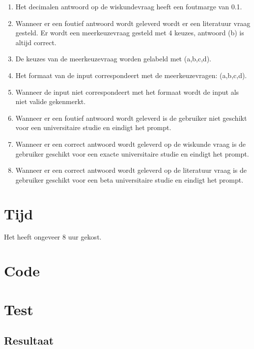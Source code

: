 \documentclass[10pt]{article}
\begin{document}
\begin{enumerate}
      \item Het decimalen antwoord op de wiskundevraag heeft een foutmarge van 0.1.
      \item Wanneer er een foutief antwoord wordt geleverd wordt er een literatuur vraag gesteld. Er wordt een
            meerkeuzevraag gesteld met 4 keuzes, antwoord (b) is altijd correct.
      \item De keuzes van de meerkeuzevraag worden gelabeld met (a,b,c,d).
      \item Het formaat van de input correspondeert met de meerkeuzevragen: (a,b,c,d).
      \item Wanneer de input niet correspondeert met het formaat wordt de input als niet valide gekenmerkt.
      \item Wanneer er een foutief antwoord wordt geleverd is de gebruiker niet geschikt voor een universitaire studie
            en
            eindigt het prompt.
      \item Wanneer er een correct antwoord wordt geleverd op de wiskunde vraag is de gebruiker geschikt voor een
            exacte
            universitaire studie en eindigt het prompt.
      \item Wanneer er een correct antwoord wordt geleverd op de literatuur vraag is de gebruiker geschikt voor een
            beta
            universitaire studie en eindigt het prompt.
\end{enumerate}

\section{Tijd}
Het heeft ongeveer 8 uur gekost.

\section{Code}\label{sec:code}


\section{Test}\label{sec:test}


\subsection{Resultaat}\label{sec:resultaat}

\end{document}
